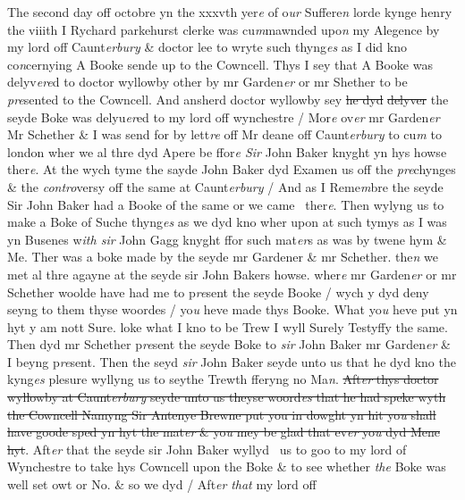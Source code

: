 \documentclass[12pt, a4paper]{book}
\begin{document}
		\ifthenelse{\isodd{\thepage}}
		{\reversemarginpar}
		{\normalmarginpar}
		The second day off octobre yn the xxxvth yer\textit{e} of o\textit{ur }Suffere\textit{n} lorde kynge henry
the viiith I Rychard parkehurst clerke was cu\textit{m}mawnded upo\textit{n} my Alegence
by my lord off Caunt\textit{erbury }\& doctor lee to wryte such thyng\textit{es} as I did kno co\textit{n}cernying A Booke sende up to the Cowncell. Thys I sey that A Booke
was delyv\textit{ere}d to doctor wyllowby other by mr Garden\textit{er} or mr Shether
to be \textit{pre}sented to the Cowncell. And ansherd doctor wyllowby sey \sout{he dyd}
	\sout{delyver} the seyde Boke was delyu\textit{er}ed to my lord off wynchestre / Mor\textit{e} ov\textit{er}
mr Garden\textit{er} Mr Schether \& I was send for by lett\textit{re} off Mr deane off
Caunt\textit{erbury} to cu\textit{m} to london wher we al thre dyd Apere be ffor\textit{e Sir} John Baker
knyght yn hys howse ther\textit{e}. At the wych tyme the sayde John Baker dyd
Examen us off the \textit{pre}chynges \& the \textit{contro}versy off the same at Caunt\textit{erbury} / And
as I Reme\textit{m}bre the seyde Sir John Baker had a Booke of the same or we came 
ther\textit{e}. Then wylyng us to make a Boke of Suche thyng\textit{es} as we dyd kno
wher upon at such tymys as I was yn Busenes w\textit{ith sir} John Gagg knyght
ffor such mat\textit{er}s as was by twene hym \& Me. Ther was a boke made
by the seyde mr Gardener \& mr Schether. the\textit{n} we met al thre agayne
at the seyde sir John Bakers howse. wher\textit{e} mr Garden\textit{er} or mr Schether
woolde have had me to p\textit{re}sent the seyde Booke / wych y dyd deny seyng
to them thyse woordes / yo\textit{u} heve made thys Booke. What yo\textit{u} heve put yn 
hyt y am nott Sure. loke what I kno to be Trew I wyll Surely Testyffy
the same. Then dyd mr Schether p\textit{re}sent the seyde Boke to \textit{sir} John Baker 
mr Garden\textit{er} \& I beyng p\textit{re}sent. Then the seyd \textit{sir} John Baker seyde unto us
that he dyd kno the kyng\textit{es} plesure wyllyng us to seythe Trewth fferyng 
	no Ma\textit{n}. \sout{Aft\textit{er} thys doctor wyllowby at Caunt\textit{erbury} seyde unto us theyse woord\textit{es}
that he had speke wyth the Cowncell Namyng Sir Antenye Brewne put you
in dowght yn hit yo\textit{u} shall have goode sped yn hyt the mat\textit{er} \& yo\textit{u} mey
be glad that ev\textit{er} yo\textit{u} dyd Mene hyt}. Aft\textit{er }that the seyde sir John Baker wyllyd 
us to goo to my lord of Wynchestre to take hys Cowncell upon the Boke \& to see
whether \textit{the} Boke was well set owt or No. \& so we dyd / Aft\textit{er}
               \textit{that} my lord off
\end{document}
